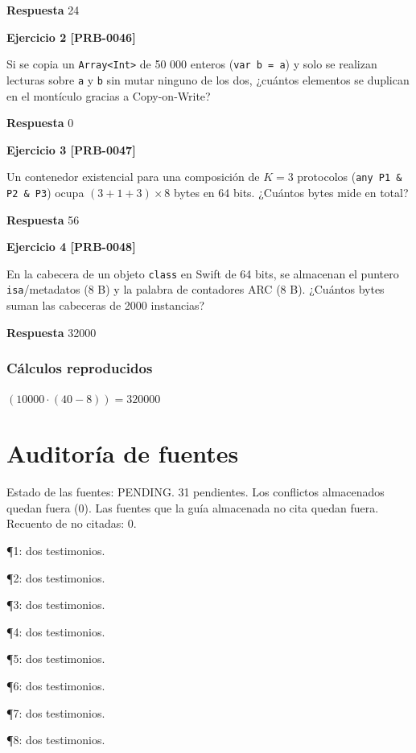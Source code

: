 \documentclass{book}
\begin{document}
\noindent\textbf{Respuesta} 24

\noindent\textbf{Ejercicio 2 [PRB-0046]}

Si se copia un \texttt{Array<Int>} de 50 000 enteros (\texttt{var b = a}) y solo se realizan lecturas sobre \texttt{a} y \texttt{b} sin mutar ninguno de los dos, ¿cuántos elementos se duplican en el montículo gracias a Copy-on-Write?

\noindent\textbf{Respuesta} 0

\noindent\textbf{Ejercicio 3 [PRB-0047]}

Un contenedor existencial para una composición de \(K = 3\) protocolos (\texttt{any P1 \& P2 \& P3}) ocupa \((3 + 1 + 3) \times 8\) bytes en 64 bits. ¿Cuántos bytes mide en total?

\noindent\textbf{Respuesta} 56

\noindent\textbf{Ejercicio 4 [PRB-0048]}

En la cabecera de un objeto \texttt{class} en Swift de 64 bits, se almacenan el puntero \texttt{isa}/metadatos (8 B) y la palabra de contadores ARC (8 B). ¿Cuántos bytes suman las cabeceras de 2000 instancias?

\noindent\textbf{Respuesta} 32000

\subsection*{Cálculos reproducidos}

\(\left(10000\cdot \left(40-8\right)\right) = 320000\)
\chapter{Auditoría de fuentes}

\noindent Estado de las fuentes: PENDING. 31 pendientes. Los conflictos almacenados quedan fuera (0). Las fuentes que la guía almacenada no cita quedan fuera. Recuento de no citadas: 0.

\noindent ¶1: dos testimonios.

\noindent ¶2: dos testimonios.

\noindent ¶3: dos testimonios.

\noindent ¶4: dos testimonios.

\noindent ¶5: dos testimonios.

\noindent ¶6: dos testimonios.

\noindent ¶7: dos testimonios.

\noindent ¶8: dos testimonios.
\end{document}
